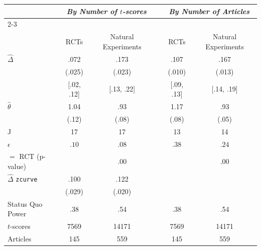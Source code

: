 \begin{tabular}{l c c c c c  }
\hline \hline 
 & \multicolumn{2}{c}{\textit{By Number of $t$-scores}} &  &\multicolumn{2}{c}{\textit{By Number of Articles}} \\
\cline{2-3} \cline{5-6} 
\\ & RCTs & Natural Experiments &  & RCTs & Natural Experiments \\
\hline
 $\hat{\Delta}$ & .072 & .173  & & .107 & .167\\
  & (.025)  & (.023) & & (.010) & (.013) \\
  & [.02, .12] & [.13, .22] & & [.09, .13] & [.14, .19]\\ 
  $\hat{\theta}$ & 1.04 & .93 & & 1.17 & .93\\
    & (.12) & (.08) & & (.08) & (.05) \\ 
 \hline  
  J  & 17& 17 &  & 13 & 14\\
  $\epsilon$ & $.10$ & $.08$ &  & $.38$ & $.24$ \\ \hline
     $=$ RCT (p-value) &  & .00 &  &  &.00 \\ \hline 
      $\hat{\Delta}$ \verb|zcurve| & .100 &  .122 & &  & \\
  & (.029)  & (.020) & &  &  \\ \hline 
        Status Quo Power & .38 & .54 && .38 & .54 \\
  $t$-scores & 7569 & 14171 &  & 7569 & 14171  \\
  Articles & 145& 559 &  & 145& 559 \\
\hline
\end{tabular}
